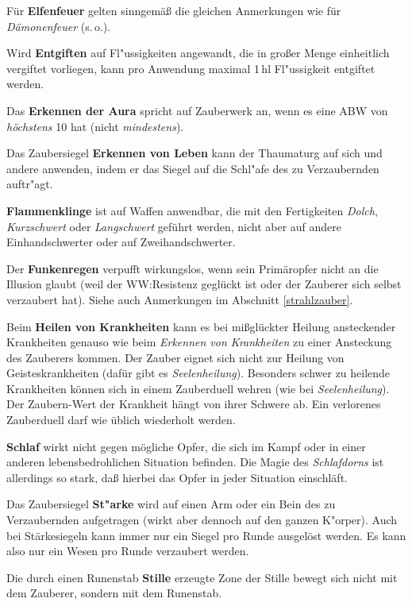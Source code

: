 \documentclass[10pt,a4paper,germanpar]{article}
\begin{document}
Für \textbf{Elfenfeuer} gelten sinngemäß die gleichen Anmerkungen
wie für \emph{Dämonenfeuer} (s.\,o.).

Wird \textbf{Entgiften} auf Fl"ussigkeiten angewandt, die in großer
Menge einheitlich vergiftet vorliegen, kann pro Anwendung maximal
1\,hl Fl"ussigkeit entgiftet werden.

Das \textbf{Erkennen der Aura} spricht auf Zauberwerk an, wenn es eine ABW von
\emph{höchstens} 10 hat (nicht \emph{mindestens}).

Das Zaubersiegel \textbf{Erkennen von Leben} kann der Thaumaturg auf
sich und andere anwenden, indem er das Siegel auf die Schl"afe des zu
Verzaubernden auftr"agt.

\textbf{Flammenklinge} ist auf Waffen anwendbar, die mit den
Fertigkeiten \emph{Dolch}, \emph{Kurzschwert} oder \emph{Langschwert}
geführt werden, nicht aber auf andere Einhandschwerter oder auf
Zweihandschwerter.

Der \textbf{Funkenregen} verpufft wirkungslos, wenn sein Primäropfer
nicht an die Illusion glaubt (weil der WW:Resistenz geglückt ist oder
der Zauberer sich selbst verzaubert hat). Siehe auch Anmerkungen im
Abschnitt \ref{strahlzauber}.

Beim \textbf{Heilen von Krankheiten} kann es bei mißglückter Heilung
ansteckender Krankheiten genauso wie beim \emph{Erkennen von
  Krankheiten} zu einer Ansteckung des Zauberers kommen. Der Zauber
eignet sich nicht zur Heilung von Geisteskrankheiten (dafür gibt es
\emph{Seelenheilung}). Besonders schwer zu heilende Krankheiten können
sich in einem Zauberduell wehren (wie bei \emph{Seelenheilung}). Der
Zaubern-Wert der Krankheit hängt von ihrer Schwere ab. Ein verlorenes
Zauberduell darf wie üblich wiederholt werden.

\textbf{Schlaf} wirkt nicht gegen mögliche Opfer, die sich im Kampf
oder in einer anderen lebensbedrohlichen Situation befinden.
Die Magie des \emph{Schlafdorns} ist allerdings so stark, daß hierbei
das Opfer in jeder Situation einschläft.

Das Zaubersiegel \textbf{St"arke} wird auf einen Arm oder ein Bein des 
zu Verzaubernden aufgetragen (wirkt aber dennoch auf den ganzen
K"orper). Auch bei Stärkesiegeln kann immer nur ein Siegel pro Runde ausgelöst
werden. Es kann also nur ein Wesen pro Runde verzaubert werden.

Die durch einen Runenstab \textbf{Stille} erzeugte Zone der Stille
bewegt sich nicht mit dem Zauberer, sondern mit dem Runenstab.
\end{document}
